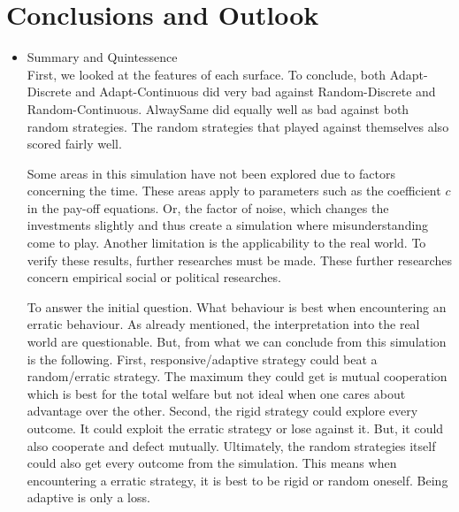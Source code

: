 \documentclass[11pt]{article}
\begin{document}
\section{Conclusions and Outlook} \label{sec:conclusion}
\begin{itemize}

	\item Summary and Quintessence\\
		First, we looked at the features of each surface.
		To conclude, both Adapt-Discrete and Adapt-Continuous did very bad against Random-Discrete and Random-Continuous.
		AlwaySame did equally well as bad against both random strategies.
		The random strategies that played against themselves also scored fairly well.

		Some areas in this simulation have not been explored due to factors concerning the time.
		These areas apply to parameters such as the coefficient $c$ in the pay-off equations.
		Or, the factor of noise, which changes the investments slightly and thus create a simulation where misunderstanding come to play.
		Another limitation is the applicability to the real world.
		To verify these results, further researches must be made.
		These further researches concern empirical social or political researches.

		To answer the initial question.
		What behaviour is best when encountering an erratic behaviour.
		As already mentioned, the interpretation into the real world are questionable.
		But, from what we can conclude from this simulation is the following.
		First, responsive/adaptive strategy could beat a random/erratic strategy.
		The maximum they could get is mutual cooperation which is best for the total welfare but not ideal when one cares about advantage over the other.
		Second, the rigid strategy could explore every outcome.
		It could exploit the erratic strategy or lose against it.
		But, it could also cooperate and defect mutually.
		Ultimately, the random strategies itself could also get every outcome from the simulation.
		This means when encountering a erratic strategy, it is best to be rigid or random oneself.
		Being adaptive is only a loss.

\end{itemize}

%
%
%
\end{document}

